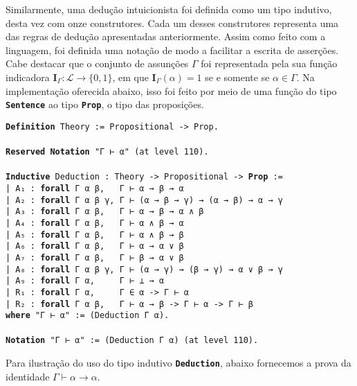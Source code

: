 \hfill\break
Similarmente, uma dedução intuicionista foi definida como um tipo indutivo, desta vez com onze construtores.
Cada um desses construtores representa uma das regras de dedução apresentadas anteriormente.
Assim como feito com a linguagem, foi definida uma notação de modo a facilitar a escrita de asserções.
Cabe destacar que o conjunto de assunções $\Gamma$ foi representada pela sua função indicadora $\mathbf{I}_\Gamma:\mathcal{L}\to\{0,1\}$, em que $\mathbf{I}_\Gamma(\alpha)=1$ se e somente se $\alpha\in\Gamma$.
Na implementação oferecida abaixo, isso foi feito por meio de uma função do tipo \texttt{\footnotesize\textbf{Sentence}} ao tipo \texttt{\footnotesize\textbf{Prop}}, o tipo das proposições.
\hfill\break
\begin{mdframed}
\noindent
\texttt
{\noindent\footnotesize\textbf{Definition} Theory := Propositional -> Prop.\\
\\
\textbf{Reserved} \textbf{Notation} "Γ ⊢ α"\ (at level 110).\\
\\
\textbf{Inductive} Deduction : Theory -> Propositional -> \textbf{Prop} :=\\
| A₁ : \textbf{forall} Γ α β,\ \ \ Γ ⊢ α → β → α\\
| A₂ : \textbf{forall} Γ α β γ, Γ ⊢ (α → β → γ) → (α → β) → α → γ\\
| A₃ : \textbf{forall} Γ α β,\ \ \ Γ ⊢ α → β → α ∧ β\\
| A₄ : \textbf{forall} Γ α β,\ \ \ Γ ⊢ α ∧ β → α\\
| A₅ : \textbf{forall} Γ α β,\ \ \ Γ ⊢ α ∧ β → β\\
| A₆ : \textbf{forall} Γ α β,\ \ \ Γ ⊢ α → α ∨ β\\
| A₇ : \textbf{forall} Γ α β,\ \ \ Γ ⊢ β → α ∨ β\\
| A₈ : \textbf{forall} Γ α β γ, Γ ⊢ (α → γ) → (β → γ) → α ∨ β → γ\\
| A₉ : \textbf{forall} Γ α,\ \ \ \ \ Γ ⊢ ⊥ → α\\
| R₁ : \textbf{forall} Γ α,\ \ \ \ \ Γ ∈ α -> Γ ⊢ α\\
| R₂ : \textbf{forall} Γ α β,\ \ \ Γ ⊢ α → β -> Γ ⊢ α -> Γ ⊢ β\\
\textbf{where} "Γ ⊢ α" := (Deduction Γ α).\\
\\
\textbf{Notation} "Γ ⊢ α" := (Deduction Γ α) (at level 110).
}
\end{mdframed}
\hfill\break
Para ilustração do uso do tipo indutivo \texttt{\footnotesize\textbf{Deduction}}, abaixo fornecemos a prova da identidade $\Gamma\vdash\alpha\to\alpha$.
